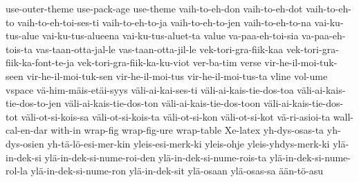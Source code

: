 {  use-outer-theme
  use-pack-age
  use-theme
  vaih-to-eh-don
  vaih-to-eh-dot
  vaih-to-eh-to
  vaih-to-eh-toi-ses-ti
  vaih-to-eh-to-ja
  vaih-to-eh-to-jen
  vaih-to-eh-to-na
  vai-ku-tus-alue
  vai-ku-tus-alueena
  vai-ku-tus-aluet-ta
  value
  va-paa-eh-toi-sia
  va-paa-eh-tois-ta
  vas-taan-otta-jal-le
  vas-taan-otta-jil-le
  vek-tori-gra-fiik-kaa
  vek-tori-gra-fiik-ka-font-te-ja
  vek-tori-gra-fiik-ka-ku-viot
  ver-ba-tim
  verse
  vir-he-il-moi-tuk-seen
  vir-he-il-moi-tuk-sen
  vir-he-il-moi-tus
  vir-he-il-moi-tus-ta
  vline
  vol-ume
  vspace
  vä-him-mäis-etäi-syys
  väli-ai-kai-ses-ti
  väli-ai-kais-tie-dos-toa
  väli-ai-kais-tie-dos-to-jen
  väli-ai-kais-tie-dos-ton
  väli-ai-kais-tie-dos-toon
  väli-ai-kais-tie-dos-tot
  väli-ot-si-kois-sa
  väli-ot-si-kois-ta
  väli-ot-si-kon
  väli-ot-si-kot
  vä-ri-asioi-ta
  wall-cal-en-dar
  with-in
  wrap-fig
  wrap-fig-ure
  wrap-table
  Xe-latex
  yh-dys-osas-ta
  yh-dys-osien
  yh-tä-lö-esi-mer-kin
  yleis-esi-merk-ki
  yleis-ohje
  yleis-yhdys-merk-ki
  ylä-in-dek-si
  ylä-in-dek-si-nume-roi-den
  ylä-in-dek-si-nume-rois-ta
  ylä-in-dek-si-nume-rol-la
  ylä-in-dek-si-nume-ron
  ylä-in-dek-sit
  ylä-osaan
  ylä-osas-sa
  ään-tö-asu
}
